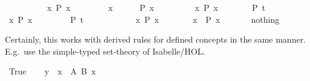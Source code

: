 \begin{isabellebody}
\ \ \ \ \isamarkupfalse%
\ \isamarkupfalse%
\isacommand{{\isacharbraceright}}\isanewline
\isanewline
\ \ \isamarkupfalse%
\ {\isachardoublequote}{\isasymforall}x{\isachardot}\ P\ x{\isachardoublequote}\isanewline
\ \ \isamarkupfalse%
\isanewline
\ \ \ \ \isamarkupfalse%
\ x\isanewline
\ \ \ \ \isamarkupfalse%
\ {\isachardoublequote}P\ x{\isachardoublequote}\ \isamarkupfalse%
\isanewline
\ \ \isamarkupfalse%
\isanewline
\isanewline
\ \ \isamarkupfalse%
\isacommand{{\isacharbraceleft}}\ \isamarkupfalse%
\ {\isachardoublequote}{\isasymforall}x{\isachardot}\ P\ x{\isachardoublequote}\isanewline
\ \ \ \ \isamarkupfalse%
\ \isamarkupfalse%
\ {\isachardoublequote}P\ t{\isachardoublequote}\ \isamarkupfalse%
\isacommand{{\isachardot}{\isachardot}}\ \isamarkupfalse%
\isacommand{{\isacharbraceright}}\isanewline
\isanewline
\ \ \isamarkupfalse%
\ {\isachardoublequote}{\isasymexists}x{\isachardot}\ P\ x{\isachardoublequote}\isanewline
\ \ \isamarkupfalse%
\isanewline
\ \ \ \ \isamarkupfalse%
\ {\isachardoublequote}P\ t{\isachardoublequote}\ \isamarkupfalse%
\isanewline
\ \ \isamarkupfalse%
\isanewline
\ \ \isanewline
\ \ \isamarkupfalse%
\isacommand{{\isacharbraceleft}}\ \isamarkupfalse%
\ {\isachardoublequote}{\isasymexists}x{\isachardot}\ P\ x{\isachardoublequote}\isanewline
\ \ \ \ \isamarkupfalse%
\ \isamarkupfalse%
\ x\ \ {\isachardoublequote}P\ x{\isachardoublequote}\ \isamarkupfalse%
\isacommand{{\isachardot}{\isachardot}}\isanewline
\ \ \ \ \isamarkupfalse%
\ nothing\ \ %
\ \isamarkupfalse%
\isacommand{{\isacharbraceright}}\isanewline
\isamarkupfalse%
\isamarkupfalse%
%
\begin{isamarkuptext}%
Certainly, this works with derived rules for defined concepts in the
  same manner.  E.g.\ use the simple-typed set-theory of Isabelle/HOL.%
\end{isamarkuptext}%
\isamarkuptrue%
\ True\isanewline
\isamarkupfalse%
\isanewline
\ \ \isamarkupfalse%
\ {\isachardoublequote}y\ {\isasymin}\ {\isacharparenleft}{\isasymInter}x\ {\isasymin}\ A{\isachardot}\ B\ x{\isacharparenright}{\isachardoublequote}\isanewline
\ \ \isamarkupfalse%
\isanewline
\ \ \ \ \isamarkupfalse%

\end{isabellebody}
